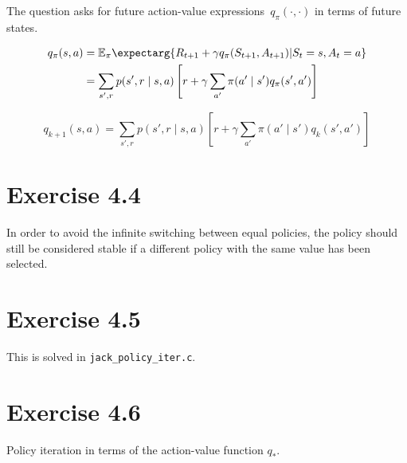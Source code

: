 \documentclass[a4paper, 12pt, titlepage]{article}
\newcommand{\exppi}{\mathbb{E}_\pi\expectarg}
\newcommand{\q}[2]{q_\pi(#1, #2)}
\begin{document}
The question asks for future action-value expressions~$\q{\cdot}{\cdot}$ in
terms of future states.

\begin{align*}
        \q{s}{a} &= \exppi{R_{t + 1} + \gamma \q{S_{t + 1}}{A_{t + 1}} | S_t = s, A_t = a} \\
                 &= \sum_{s', r} p(s', r \mid s, a) \left[r + \gamma \sum_{a'} \pi(a' \mid s') \q{s'}{a'}\right]
\end{align*}

\begin{equation*}
        q_{k + 1}(s, a) = \sum_{s', r} p(s', r \mid s, a) \left[r + \gamma \sum_{a'} \pi(a' \mid s') q_k(s', a')\right]
\end{equation*}


\section{Exercise 4.4}

In order to avoid the infinite switching between equal policies, the policy
should still be considered stable if a different policy with the same value has
been selected.


\section{Exercise 4.5}

This is solved in \verb|jack_policy_iter.c|.


\section{Exercise 4.6}

Policy iteration in terms of the action-value function $q_*$.

\begin{algorithmic}[1]
        \Do{}
                \EndFor{}
        \doWhile{$\Delta < \theta$}
\end{algorithmic}
\end{document}
